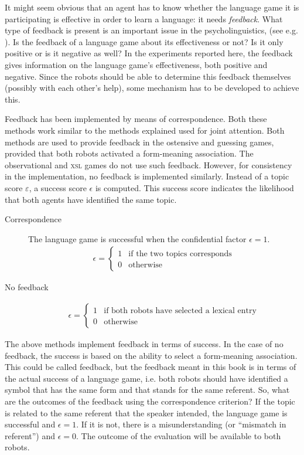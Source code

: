 It might seem obvious that an agent has to know whether the language game it is participating is effective in order to learn a language: it needs {\em feedback}. What type of feedback is present is an important issue in the psycholinguistics, (see e.g. \citealt{bowerman:1988}). Is the feedback of a language game about its effectiveness or not? Is it only positive or is it negative as well? In the experiments reported here, the feedback gives information on the language game's effectiveness, both positive and negative. Since the robots should be able to determine this feedback themselves (possibly with each other's help), some mechanism has to be developed to achieve this.

Feedback has been implemented by means of correspondence. Both these methods work similar to the methods explained used for joint attention. Both methods are used to provide feedback in the ostensive and guessing games, provided that both robots activated a form-meaning association.  The observational and {\scshape xsl} games do not use such feedback. However, for consistency in the implementation, no feedback is implemented similarly. Instead of a topic score $\varepsilon$, a success score $\epsilon$ is computed. This success score indicates the likelihood that both agents have identified the same topic.

\begin{description}
\item[Correspondence]
The language game is successful when the confidential factor $\epsilon=1$.\begin{eqnarray}\epsilon = \left \{ \begin{array}{rl}
1 & \mbox{if the two topics corresponds}\\
0 & \mbox{otherwise}
\end{array}
\right.
\end{eqnarray}

\item[No feedback]
\begin{eqnarray}
\epsilon = \left \{ \begin{array}{rl}
1 & \mbox{if both robots have selected a lexical entry}\\
0 & \mbox{otherwise}
\end{array}
\right.
\end{eqnarray}
\end{description}


The above methods implement feedback in terms of success. In the case of no feedback, the success is based on the ability to select a form-meaning association. This could be called feedback, but the feedback meant in this book is in terms of the actual success of a language game, i.e. both robots should have identified a symbol that has the same form and that stands for the same referent. So, what are the outcomes of the feedback using the correspondence criterion? If the topic is related to the same referent that the speaker intended, the language game is successful and $\epsilon=1$. If it is not, there is a misunderstanding (or ``mismatch in referent'') and $\epsilon=0$. The outcome of the evaluation will be available to both robots.

